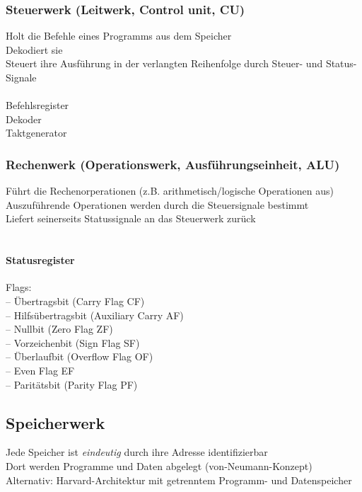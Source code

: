 \documentclass[a4paper]{scrartcl}
\begin{document}
			\subsubsection{Steuerwerk (Leitwerk, Control unit, CU)}
			Holt die Befehle eines Programms aus dem Speicher \\
			Dekodiert sie\\
			Steuert ihre Ausführung in der verlangten Reihenfolge durch	Steuer- und Status-Signale \\
			\\
			Befehlsregister\\
			Dekoder\\
			Taktgenerator\\
			
			\subsubsection{Rechenwerk (Operationswerk, Ausführungseinheit, ALU)}
			Führt die Rechenorperationen (z.B. arithmetisch/logische Operationen aus)\\
			Auszuführende Operationen werden durch die 	Steuersignale bestimmt \\
			Liefert seinerseits Statussignale an das Steuerwerk zurück\\
			\\
			\paragraph{Statusregister}
			Flags:\\
			-- Übertragsbit (Carry Flag CF)\\
			-- Hilfsübertragsbit (Auxiliary Carry AF)\\
			-- Nullbit (Zero Flag ZF)\\
			-- Vorzeichenbit (Sign Flag SF)\\
			-- Überlaufbit (Overflow Flag OF)\\
			-- Even Flag EF\\
			-- Paritätsbit (Parity Flag PF)\\
			
		\subsection{Speicherwerk}
		Jede Speicher ist \emph{eindeutig} durch ihre Adresse identifizierbar\\
		Dort werden Programme und Daten abgelegt (von-Neumann-Konzept)\\
		Alternativ: Harvard-Architektur	mit getrenntem Programm- und Datenspeicher\\
		
\end{document}
